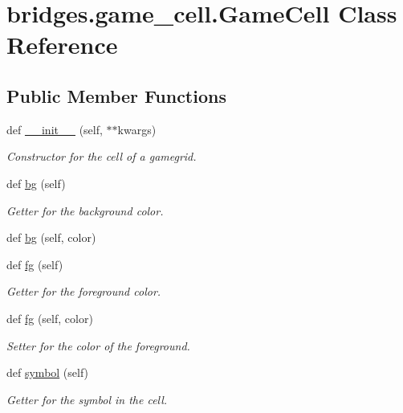 \hypertarget{classbridges_1_1game__cell_1_1_game_cell}{}\section{bridges.\+game\+\_\+cell.\+Game\+Cell Class Reference}
\label{classbridges_1_1game__cell_1_1_game_cell}
\subsection*{Public Member Functions}
\begin{DoxyCompactItemize}
\item 
def \mbox{\hyperlink{classbridges_1_1game__cell_1_1_game_cell_a0cf20982ffa11a41f65d782d5954c264}{\+\_\+\+\_\+init\+\_\+\+\_\+}} (self, $\ast$$\ast$kwargs)
\begin{DoxyCompactList}\small\item\em Constructor for the cell of a gamegrid. \end{DoxyCompactList}\item 
def \mbox{\hyperlink{classbridges_1_1game__cell_1_1_game_cell_a64581c2fd4a7c1da8e302ba9f843aae4}{bg}} (self)
\begin{DoxyCompactList}\small\item\em Getter for the background color. \end{DoxyCompactList}\item 
def \mbox{\hyperlink{classbridges_1_1game__cell_1_1_game_cell_ac500927058f98ad319821d5c89c91246}{bg}} (self, color)
\item 
def \mbox{\hyperlink{classbridges_1_1game__cell_1_1_game_cell_a351a23a7e0c4a8b026ab95bff6c05e35}{fg}} (self)
\begin{DoxyCompactList}\small\item\em Getter for the foreground color. \end{DoxyCompactList}\item 
def \mbox{\hyperlink{classbridges_1_1game__cell_1_1_game_cell_ae49f154ef62b58e70c06b6a1da230acc}{fg}} (self, color)
\begin{DoxyCompactList}\small\item\em Setter for the color of the foreground. \end{DoxyCompactList}\item 
def \mbox{\hyperlink{classbridges_1_1game__cell_1_1_game_cell_adc1c02a52845c2673d43167212574904}{symbol}} (self)
\begin{DoxyCompactList}\small\item\em Getter for the symbol in the cell. \end{DoxyCompactList}\item 
$$
\end{DoxyCompactItemize}
